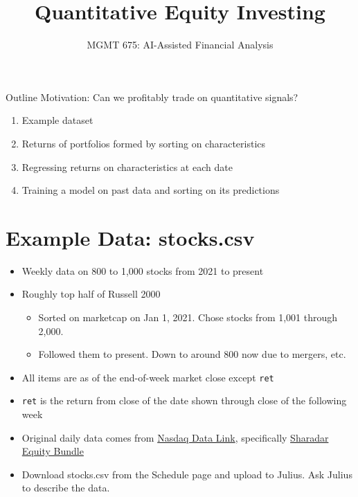 \documentclass[10pt]{beamer}
\title{Quantitative Equity Investing}
\subtitle{MGMT 675: AI-Assisted Financial Analysis}
\date{}
\begin{document}
\begin{frame}[plain]
\titlepage
\end{frame}

\begin{frame}{Outline}
    Motivation: Can we profitably trade on quantitative signals?
    \vspace{1em}
    \begin{enumerate}
    \item Example dataset
    \item Returns of portfolios formed by sorting on characteristics
     \item Regressing returns on characteristics at each date
\item Training a model on past data and sorting on its predictions
    \end{enumerate}
\end{frame}

\section{Example Data: stocks.csv}

\begin{frame}[fragile]
\begin{itemize}
    \item Weekly data on 800 to 1,000 stocks from 2021 to present
    \item Roughly top half of Russell 2000
    \begin{itemize}
    \item Sorted on marketcap on Jan 1, 2021.  Chose stocks from 1,001 through 2,000.  
    \item Followed them to present.  Down to around 800 now due to mergers, etc.
    \end{itemize}
    \item All items are as of the end-of-week market close except \verb!ret!
    \item \verb!ret! is the return from close of the date shown through close of the following week
    \item Original daily data comes from \href{https://www.nasdaq.com/solutions/data/nasdaq-data-link}{Nasdaq Data Link}, specifically \href{https://data.nasdaq.com/databases/SFA}{Sharadar Equity Bundle}
 \item Download stocks.csv from the Schedule page and upload to Julius.  Ask Julius to describe the data.
\end{itemize}
\end{frame}
\end{document}

